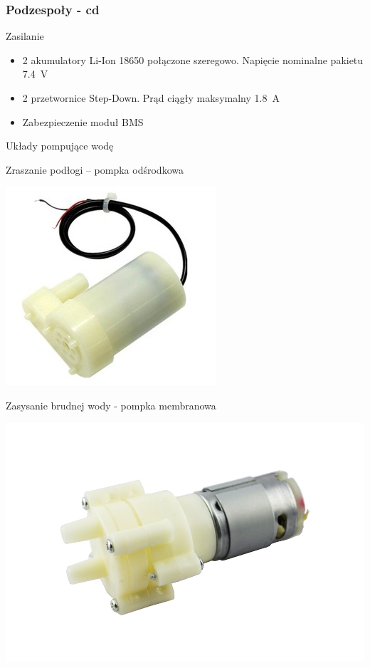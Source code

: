 \begin{frame}
\frametitle{Podzespoły - cd}
\begin{block}{Zasilanie}
\begin{itemize}
\item 2 akumulatory Li-Ion 18650 połączone szeregowo. Napięcie nominalne pakietu 7.4~V
\item 2 przetwornice Step-Down. Prąd ciągły maksymalny 1.8~A
\item Zabezpieczenie moduł BMS
\end{itemize}
\end{block}
\begin{block}{Układy pompujące wodę}
	\begin{minipage}{0.49\textwidth}
		Zraszanie podłogi -- pompka odśrodkowa
		\begin{center}
			\includegraphics[scale=0.2]{pompka.jpg}\hspace{12mm} 
		\end{center}
	\end{minipage}
	\begin{minipage}{0.49\textwidth}
		Zasysanie brudnej wody - pompka membranowa
		\begin{center}
			\includegraphics[scale=0.35]{rys/membranowa.jpg}\hspace{12mm} 
		\end{center}
	\end{minipage}
\end{block}
\end{frame}

